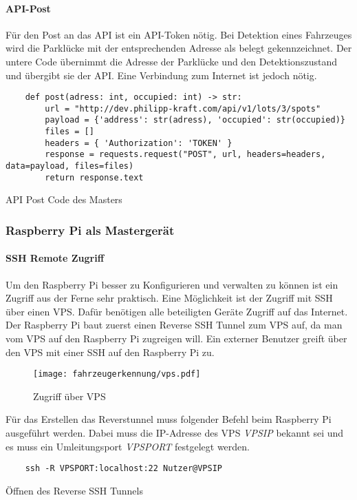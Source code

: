 \paragraph{API-Post}\mbox{}

Für den Post an das API ist ein API-Token nötig. Bei Detektion eines Fahrzeuges wird die Parklücke mit der entsprechenden Adresse als belegt gekennzeichnet. Der untere Code übernimmt die Adresse der Parklücke und den Detektionszustand und übergibt sie der API.
Eine Verbindung zum Internet ist jedoch nötig.

\begin{listing}[H]
    \begin{verbatim}
    def post(adress: int, occupied: int) -> str:
        url = "http://dev.philipp-kraft.com/api/v1/lots/3/spots"
        payload = {'address': str(adress), 'occupied': str(occupied)}
        files = []
        headers = { 'Authorization': 'TOKEN' }
        response = requests.request("POST", url, headers=headers, data=payload, files=files)
        return response.text
    \end{verbatim}
    \caption{API Post Code des Masters}
\end{listing}


\subsubsection{Raspberry Pi als Mastergerät}
\paragraph{SSH Remote Zugriff} \mbox{} 

Um den Raspberry Pi besser zu Konfigurieren und verwalten zu können ist ein Zugriff aus der Ferne sehr praktisch. Eine Möglichkeit ist der Zugriff mit SSH über einen VPS. Dafür benötigen alle beteiligten Geräte Zugriff auf das Internet.
Der Raspberry Pi baut zuerst einen Reverse SSH Tunnel zum VPS auf, da man vom VPS auf den Raspberry Pi zugreigen will. Ein externer Benutzer greift über den VPS mit einer SSH auf den Raspberry Pi zu.

\begin{figure}[H]
    \centering
    \texttt{[image: fahrzeugerkennung/vps.pdf]}
    \caption{Zugriff über VPS}
\end{figure}
Für das Erstellen das Reverstunnel muss folgender Befehl beim Raspberry Pi ausgeführt werden. Dabei muss die IP-Adresse des VPS \textit{VPSIP} bekannt sei und es muss ein Umleitungsport \textit{VPSPORT} festgelegt werden.
\begin{listing}[H]
    \begin{verbatim}
    ssh -R VPSPORT:localhost:22 Nutzer@VPSIP
    \end{verbatim}
    \caption{Öffnen des Reverse SSH Tunnels}
\end{listing}

